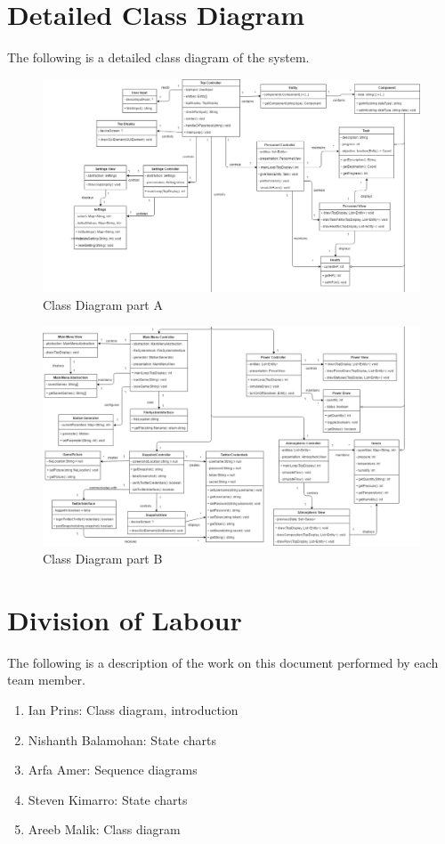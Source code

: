 \documentclass[]{article}
\begin{document}
\section{Detailed Class Diagram}
\label{sec:detailed_class_diagram}
The following is a detailed class diagram of the system.
\begin{figure}[H]
	\centering
	\includegraphics[width=220mm, angle=90]{ClassDiagramA.png}
	\caption{Class Diagram part A}
\end{figure}
\begin{figure}[H]
	\centering
	\includegraphics[width=220mm, angle=90]{ClassDiagramB.png}
	\caption{Class Diagram part B}
\end{figure}

\appendix
\section{Division of Labour}
\label{sec:division_of_labour}
The following is a description of the work on this document performed by each team member.
\begin{enumerate}
	\item Ian Prins: Class diagram, introduction
	\item Nishanth Balamohan: State charts
	\item Arfa Amer: Sequence diagrams
	\item Steven Kimarro: State charts
	\item Areeb Malik: Class diagram
\end{enumerate}
\end{document}
